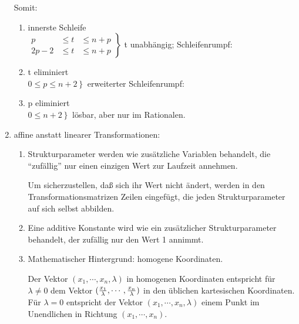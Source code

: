 \begin{enumerate}
\newpage

Somit:
\begin{enumerate}
    \item innerste Schleife\\
$\left.
    \begin{array}{ccc}
        p    &\leq t &\leq n+p \\
        2p-2 &\leq t &\leq n+p
    \end{array}
\right\}$ t unabhängig; Schleifenrumpf:
\begin{procedure}[ht]
\end{procedure}


    \item t eliminiert\\
$\left.
0 \leq p \leq n+2
\right\}$ erweiterter Schleifenrumpf:
\begin{procedure}[ht]
 {
}
\end{procedure}

    \item p eliminiert\\
$\left. 0 \leq n+2 \right\}$ lösbar, aber nur im Rationalen.
\end{enumerate}


\item affine anstatt linearer Transformationen:
  \begin{enumerate}
    \item Strukturparameter werden wie zusätzliche Variablen behandelt,
      die ``zufällig'' nur einen einzigen Wert zur Laufzeit annehmen.

      Um sicherzustellen, daß sich ihr Wert nicht ändert, werden in den
      Transformationsmatrizen Zeilen eingefügt, die jeden
      Strukturparameter auf sich selbst abbilden.
    \item Eine additive Konstante wird wie ein zusätzlicher
      Strukturparameter behandelt, der zufällig nur den Wert 1 annimmt.
    \item Mathematischer Hintergrund: homogene Koordinaten.
      
      Der Vektor $(x_1,\cdots,x_n,\lambda)$ in homogenen Koordinaten
      entspricht für $\lambda\not=0$ dem Vektor $({x_1\over
        \lambda},\cdots,{x_n\over \lambda})$ in den üblichen
      kartesischen Koordinaten. Für $\lambda=0$ entspricht der Vektor
      $(x_1,\cdots,x_n,\lambda)$ einem Punkt im Unendlichen in Richtung
      $(x_1,\cdots,x_n)$.
  \end{enumerate}
\end{enumerate}

